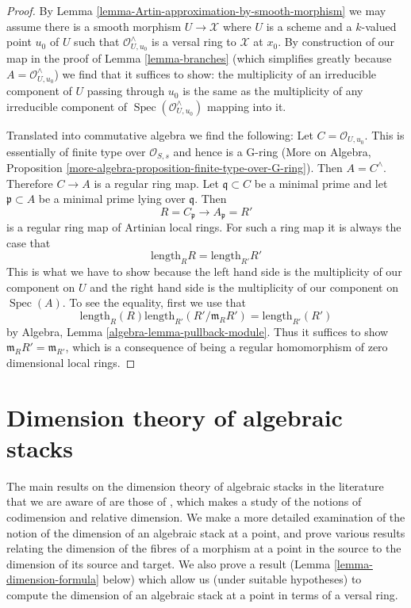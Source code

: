 \documentclass{stacks-project}
\theoremstyle{plain}
\theoremstyle{definition}
\theoremstyle{remark}
\numberwithin{equation}{subsection}
\def\Spec{\mathop{\mathrm{Spec}}}
\begin{document}
\begin{proof}
By Lemma \ref{lemma-Artin-approximation-by-smooth-morphism} we
may assume there is a smooth morphism $U \to \mathcal{X}$
where $U$ is a scheme and a $k$-valued point $u_0$ of $U$
such that $\mathcal{O}_{U, u_0}^\wedge$ is a versal ring to
$\mathcal{X}$ at $x_0$. By construction of our map in
the proof of Lemma \ref{lemma-branches} (which simplifies
greatly because $A = \mathcal{O}_{U, u_0}^\wedge$) we find
that it suffices to show: the multiplicity of an irreducible
component of $U$ passing through $u_0$ is the same as the
multiplicity of any irreducible component of
$\Spec(\mathcal{O}_{U, u_0}^\wedge)$ mapping into it.

\medskip\noindent
Translated into commutative algebra we find the following:
Let $C = \mathcal{O}_{U, u_0}$. This is essentially of finite type
over $\mathcal{O}_{S, s}$ and hence is a G-ring (More on Algebra,
Proposition \ref{more-algebra-proposition-finite-type-over-G-ring}).
Then $A = C^\wedge$. Therefore $C \to A$ is a regular ring map.
Let $\mathfrak q \subset C$ be a minimal prime and let $\mathfrak p \subset A$
be a minimal prime lying over $\mathfrak q$. Then
$$
R = C_\mathfrak p \longrightarrow A_\mathfrak p = R'
$$
is a regular ring map of Artinian local rings. For such a ring map
it is always the case that
$$
\text{length}_R R = \text{length}_{R'} R'
$$
This is what we have to show because the left hand side
is the multiplicity of our component on $U$ and the right hand
side is the multiplicity of our component on $\Spec(A)$.
To see the equality, first we use that
$$
\text{length}_R(R) \text{length}_{R'}(R'/\mathfrak m_R R') =
\text{length}_{R'}(R')
$$
by Algebra, Lemma \ref{algebra-lemma-pullback-module}. Thus it suffices
to show $\mathfrak m_R R' = \mathfrak m_{R'}$, which is a consequence
of being a regular homomorphism of zero dimensional local rings.
\end{proof}













\section{Dimension theory of algebraic stacks}
\label{section-dimension-of-algebraic-stacks}

\noindent
The main results on the dimension theory of algebraic stacks in the
literature that we are aware of are those of \cite{Osserman}, which
makes a study of the notions of codimension and relative dimension. We
make a more detailed examination of the notion of the dimension of an
algebraic stack at a point, and prove various results
relating the dimension of the fibres of a morphism at a point in the source
to the dimension of its source and target.  We also prove a result
(Lemma \ref{lemma-dimension-formula} below) which
allow us (under suitable hypotheses) to compute the dimension of
an algebraic stack at a point in terms of a versal ring.
\end{document}
